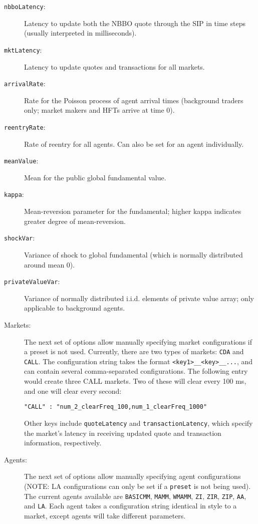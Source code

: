\documentclass[11pt]{article}
\begin{document}
\begin{description}
  \item[\texttt{nbboLatency}:] Latency to update both the NBBO quote through the SIP in time steps (usually interpreted in milliseconds).

  \item[\texttt{mktLatency}:] Latency to update quotes and transactions for all markets.

  \item[\texttt{arrivalRate}:] Rate for the Poisson process of agent arrival times (background traders only; market makers and HFTs arrive at time 0).

  \item[\texttt{reentryRate}:] Rate of reentry for all agents. Can also be set for an agent individually.

  \item[\texttt{meanValue}:] Mean for the public global fundamental value.

  \item[\texttt{kappa}:] Mean-reversion parameter for the fundamental; higher kappa indicates greater degree of mean-reversion.

  \item[\texttt{shockVar}:] Variance of shock to global fundamental (which is normally distributed around mean 0).

  \item[\texttt{privateValueVar}:] Variance of normally distributed i.i.d. elements of private value array; only applicable to background agents.


\item[Markets:] The next set of options allow manually specifying market configurations
  if a preset is not used. Currently, there are two types of markets: \texttt{CDA} and \texttt{CALL}. The configuration string takes the format
  \texttt{<key1>\_<value1>\_<key>\_<value2>\_...}, and can contain several comma-separated configurations. The following entry would create three CALL
  markets. Two of these will clear every 100 ms, and one will clear every
  second:

\begin{verbatim}
"CALL" : "num_2_clearFreq_100,num_1_clearFreq_1000"
\end{verbatim}

  Other keys include \texttt{quoteLatency} and \texttt{transactionLatency}, which specify the market's latency in receiving updated quote and transaction information, respectively.

\item[Agents:] The next set of options allow manually specifying agent
  configurations (NOTE: LA configurations can only be set if a \texttt{preset}
  is not being used). The current agents available are \texttt{BASICMM}, \texttt{MAMM}, \texttt{WMAMM},
  \texttt{ZI}, \texttt{ZIR}, \texttt{ZIP}, \texttt{AA}, and \texttt{LA}. Each
  agent takes a configuration string identical in style to a market, except agents
  will take different parameters.

\end{description}
\end{document}
